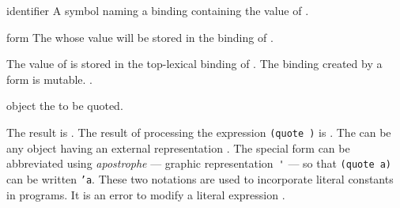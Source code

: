 \begin{optDefinition}
%
\Syntax
{}%
%
\begin{arguments}
    \item[identifier] A symbol naming a binding containing the value of
    .

    \item[form] The  whose value will be stored in the binding of
    .
\end{arguments}
%
\remarks%
The value of  is stored in the top-lexical binding of
.  The binding created by a  form is
mutable.
%
\seealso%
.

%
\Syntax
{}%
%
\begin{arguments}
    \item[object] the  to be quoted.
\end{arguments}
%
\result%
The result is .
%
\remarks%
The result of processing the expression {\tt (quote )} is
.  The  can be any object having an external
representation .  The special form
 can be abbreviated using {\em apostrophe} --- graphic
representation~\verb+'+ --- so that
{\tt (quote a)} can be written {\tt 'a}.  These two notations are used to
incorporate literal constants  in programs.
It is an error to modify a literal expression
.
\end{optDefinition}

